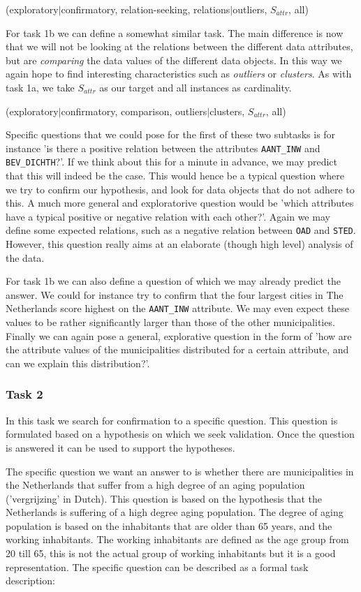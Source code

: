(exploratory$|$confirmatory, relation-seeking, relations$|$outliers, $S_{attr}$, all)

For task 1b we can define a somewhat similar task. The main difference is now that we will not be looking at the relations between the different data attributes, but are \textit{comparing} the data values of the different data objects. In this way we again hope to find interesting characteristics such as \textit{outliers} or \textit{clusters}. As with task 1a, we take $S_{attr}$ as our target and all instances as cardinality.

(exploratory$|$confirmatory, comparison, outliers$|$clusters, $S_{attr}$, all)

Specific questions that we could pose for the first of these two subtasks is for instance 'is there a positive relation between the attributes \texttt{AANT\_INW} and \texttt{BEV\_DICHTH}?'. If we think about this for a minute in advance, we may predict that this will indeed be the case. This would hence be a typical question where we try to confirm our hypothesis, and look for data objects that do not adhere to this. A much more general and exploratorive question would be 'which attributes have a typical positive or negative relation with each other?'. Again we may define some expected relations, such as a negative relation between \texttt{OAD} and \texttt{STED}. However, this question really aims at an elaborate (though high level) analysis of the data.

For task 1b we can also define a question of which we may already predict the answer. We could for instance try to confirm that the four largest cities in The Netherlands score highest on the \texttt{AANT\_INW} attribute. We may even expect these values to be rather significantly larger than those of the other municipalities. Finally we can again pose a general, explorative question in the form of 'how are the attribute values of the municipalities distributed for a certain attribute, and can we explain this distribution?'.




\subsubsection{Task 2}\label{sec:task2}
In this task we search for confirmation to a specific question.
This question is formulated based on a hypothesis on which we seek validation.
Once the question is answered it can be used to support the hypotheses.

The specific question we want an answer to is whether there are municipalities in the Netherlands that suffer from a high degree of an aging population ('vergrijzing' in Dutch).
This question is based on the hypothesis that the Netherlands is suffering of a high degree aging population. The degree of aging population is based on the inhabitants that are older than 65 years, and the working inhabitants. The working inhabitants are defined as the age group from 20 till 65, this is not the actual group of working inhabitants but it is a good representation. The specific question can be described as a formal task description:


